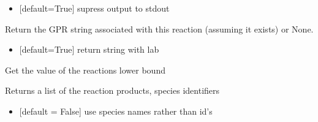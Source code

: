 \documentclass[letterpaper,10pt,english]{sphinxmanual}
\begin{document}
\begin{fulllineitems}
\begin{fulllineitems}
\begin{itemize}
\item {} 
\sphinxAtStartPar
{} {[}default=True{]} supress output to stdout

\end{itemize}

\end{fulllineitems}


\begin{fulllineitems}
\label{\detokenize{modules_doc:cbmpy.CBModel.Reaction.getGPRassociationString}}
\pysigstartsignatures
{}
\pysigstopsignatures
\sphinxAtStartPar
Return the GPR string associated with this reaction (assuming it exists) or None.
\begin{itemize}
\item {} 
\sphinxAtStartPar
{} {[}default=True{]} return string with lab

\end{itemize}

\end{fulllineitems}


\begin{fulllineitems}
\label{\detokenize{modules_doc:cbmpy.CBModel.Reaction.getLowerBound}}
\pysigstartsignatures
{}
\pysigstopsignatures
\sphinxAtStartPar
Get the value of the reactions lower bound

\end{fulllineitems}


\begin{fulllineitems}
\label{\detokenize{modules_doc:cbmpy.CBModel.Reaction.getProductIds}}
\pysigstartsignatures
{}
\pysigstopsignatures
\sphinxAtStartPar
Returns a list of the reaction products, species identifiers
\begin{itemize}
\item {} 
\sphinxAtStartPar
{} {[}default = False{]} use species names rather than id’s


\end{itemize}
\end{fulllineitems}
\end{fulllineitems}
\end{document}
